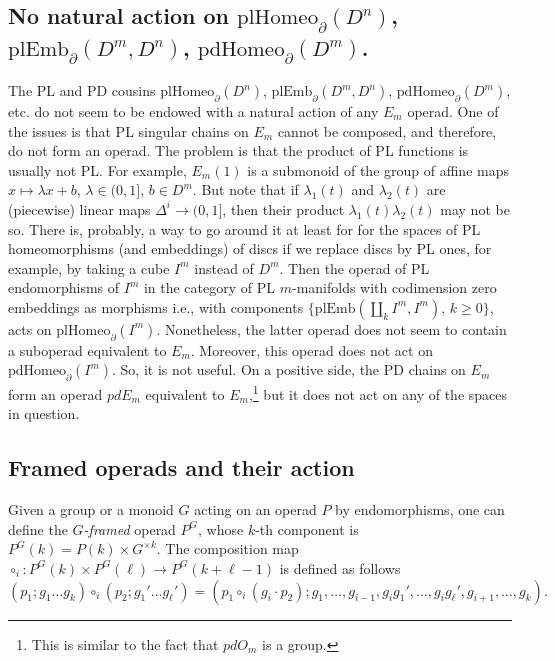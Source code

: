 \documentclass[11pt]{amsart}
\theoremstyle{definition}
\newcommand{\plEmbmn}{\mathrm{plEmb}_\partial(D^m,D^n)}
\newcommand{\plEmb}{\mathrm{plEmb}}
\newcommand{\plHomeo}{\mathrm{plHomeo}}
\newcommand{\pdHomeo}{\mathrm{pdHomeo}}
\numberwithin{equation}{section}
\begin{document}
\subsection{No natural action on $\plHomeo_\partial(D^n)$, $\plEmbmn$, $\pdHomeo_\partial(D^m)$.}
 The PL and PD cousins $\plHomeo_\partial(D^n)$, $\plEmbmn$, $\pdHomeo_\partial(D^m)$, etc.
do not seem to be endowed with a natural action of any $E_m$ operad. One of the issues is that PL singular chains on $E_m$ cannot be composed,
and therefore, do not form an operad. The problem is that the product of PL functions is usually not PL. For example, $E_m(1)$ is a submonoid of the group of affine maps $x\mapsto \lambda x+b$, $\lambda\in (0,1]$, $b\in D^m$. But note that if $\lambda_1(t)$ and $\lambda_2(t)$ are (piecewise) linear maps $\Delta^i\to (0,1]$, then their product $\lambda_1(t)\lambda_2(t)$ may not be so. There is, probably, a way to go around it at least for for the spaces of PL  homeomorphisms (and embeddings) of discs if we replace discs by PL ones, for example, by taking a cube $I^m$ instead of $D^m$. Then the operad %
of PL endomorphisms of $I^m$ in the category of PL $m$-manifolds with codimension zero embeddings as morphisms i.e., with components 
$\{\plEmb(\coprod_k I^m,I^m),\, k\geq 0\}$, acts on $\plHomeo_\partial(I^m)$. Nonetheless, the latter operad does not seem to contain a suboperad equivalent to $E_m$. Moreover, this operad does not act on $\pdHomeo_\partial(I^m)$. So, it is not useful. On a positive side, the PD chains on $E_m$ form an operad $pdE_m$ equivalent to $E_m$,\footnote{This is similar to the fact that $pdO_m$ is a group.} but it does not act on any of the spaces in question. 


\subsection{Framed operads and their action}\label{ss:fr_operads}
Given a group or a monoid $G$ acting on an operad $P$ by endomorphisms, one can define the {\it $G$-framed} operad $P^G$, whose $k$-th
component is $P^G(k)=P(k)\times G^{\times k}$. The composition map $\circ_i\colon P^G(k)\times P^G(\ell)\to P^G(k+\ell-1)$ is defined as
follows
\[
(p_1;g_1\ldots g_k)\circ_i (p_2;g_1'\ldots g_\ell')=
(p_1\circ_i(g_i\cdot p_2);g_1,\ldots,g_{i-1},g_i g_1',\ldots,g_i g_\ell',g_{i+1},\ldots,g_k).
\]
\end{document}
